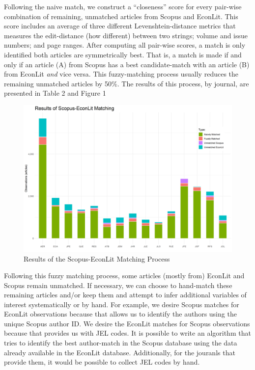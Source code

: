 \documentclass[11pt, letterpaper, twoside]{article}
\begin{document}
Following the naive match, we construct a ``closeness'' score for every pair-wise combination of remaining, unmatched articles from Scopus and EconLit. This score includes an average of three different Levenshtein-distance metrics that measures the edit-distance (how different) between two strings; volume and issue numbers; and page ranges. After computing all pair-wise scores, a match is only identified both articles are symmetrically best. That is, a match is made if and only if an article (A) from Scopus has a best candidate-match with an article (B) from EconLit \textit{and} vice versa. This fuzzy-matching process usually reduces the remaining unmatched articles by 50\%. The results of this process, by journal, are presented in Table 2 and Figure 1\\



\begin{figure}[h]
    \centering    
    \includegraphics[width=\textwidth]{figures/scopus_econlit_matching_results.png}
    \caption{Results of the Scopus-EconLit Matching Process}
\end{figure}

Following this fuzzy matching process, some articles (mostly from) EconLit and Scopus remain unmatched. If necessary, we can choose to hand-match these remaining articles and/or keep them and attempt to infer additional variables of interest systematically or by hand. For example, we desire Scopus matches for EconLit observations because that allows us to identify the authors using the unique Scopus author ID. We desire the EconLit matches for Scopus observations because that provides us with JEL codes. It is possible to write an algorithm that tries to identify the best author-match in the Scopus database using the data already available in the EconLit database. Additionally, for the jouranls that provide them, it would be possible to collect JEL codes by hand.
\end{document}
